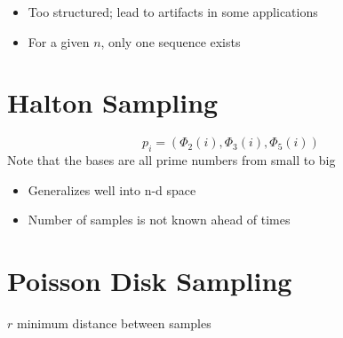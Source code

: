   \begin{itemize}
    \item Too structured; lead to artifacts in some applications
    \item For a given $ n $, only one sequence exists
  \end{itemize}

\section{Halton Sampling}

  \begin{equation}
    p_{i} =
    \left(
      \Phi_{2} \left( i \right),
      \Phi_{3} \left( i \right),
      \Phi_{5} \left( i \right)
    \right)
  \end{equation}
  Note that the bases are all prime numbers from small to big

  \begin{itemize}
    \item Generalizes well into n-d space
    \item Number of samples is not known ahead of times
  \end{itemize}

\section{Poisson Disk Sampling}

  $ r $ minimum distance between samples

